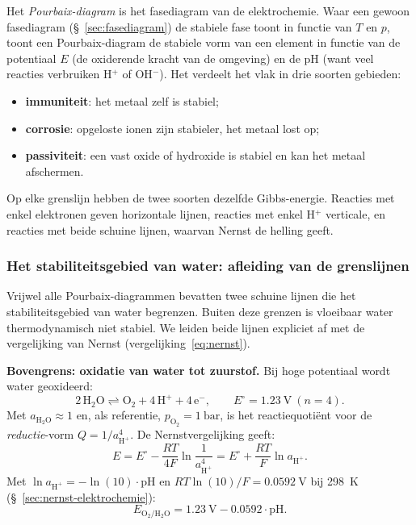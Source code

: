 Het \emph{Pourbaix-diagram} is het fasediagram van de elektrochemie. Waar een gewoon fasediagram (\S~\ref{sec:fasediagram}) de stabiele fase toont in functie van $T$ en $p$, toont een Pourbaix-diagram de stabiele vorm van een element in functie van de potentiaal $E$ (de oxiderende kracht van de omgeving) en de pH (want veel reacties verbruiken H$^+$ of OH$^-$). Het verdeelt het vlak in drie soorten gebieden:
\begin{itemize}
\item \textbf{immuniteit}: het metaal zelf is stabiel;
\item \textbf{corrosie}: opgeloste ionen zijn stabieler, het metaal lost op;
\item \textbf{passiviteit}: een vast oxide of hydroxide is stabiel en kan het metaal afschermen.
\end{itemize}
Op elke grenslijn hebben de twee soorten dezelfde Gibbs-energie. Reacties met enkel elektronen geven horizontale lijnen, reacties met enkel H$^+$ verticale, en reacties met beide schuine lijnen, waarvan Nernst de helling geeft.

\subsubsection{Het stabiliteitsgebied van water: afleiding van de grenslijnen}
\label{sec:pourbaix-waterlijnen}

Vrijwel alle Pourbaix-diagrammen bevatten twee schuine lijnen die het stabiliteitsgebied van water begrenzen. Buiten deze grenzen is vloeibaar water thermodynamisch niet stabiel. We leiden beide lijnen expliciet af met de vergelijking van Nernst (vergelijking~\eqref{eq:nernst}).

\textbf{Bovengrens: oxidatie van water tot zuurstof.} Bij hoge potentiaal wordt water geoxideerd:
\[
\mathrm{2\,H_2O \rightleftharpoons O_2 + 4\,H^+ + 4\,e^-}, \qquad E^\circ=\SI{1.23}{\volt}\ (n=4).
\]
Met $a_{\mathrm{H_2O}}\approx1$ en, als referentie, $p_{\mathrm{O_2}}=\SI{1}{\bar}$, is het reactiequoti\"ent voor de \emph{reductie}-vorm $Q=1/a_{\mathrm{H^+}}^4$. De Nernstvergelijking geeft:
\[
E = E^\circ - \frac{RT}{4F}\ln\frac{1}{a_{\mathrm{H^+}}^4} = E^\circ + \frac{RT}{F}\ln a_{\mathrm{H^+}}.
\]
Met $\ln a_{\mathrm{H^+}} = -\ln(10)\cdot\mathrm{pH}$ en $RT\ln(10)/F=\SI{0.0592}{\volt}$ bij \SI{298}{\kelvin} (\S~\ref{sec:nernst-elektrochemie}):
\begin{equation}
\boxed{\;E_{\mathrm{O_2/H_2O}} = \SI{1.23}{\volt} - \num{0.0592}\cdot\mathrm{pH}.\;}
\label{eq:lijn-boven}
\end{equation}

